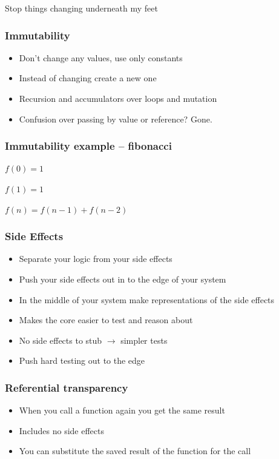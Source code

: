 \documentclass{beamer}
\begin{document}
\begin{frame}
\begin{center}
\Huge Stop things changing underneath my feet
\end{center}
\end{frame}

\begin{frame}
\frametitle{Immutability}
\begin{itemize}
\item Don't change any values, use only constants
\item Instead of changing create a new one
\item Recursion and accumulators over loops and mutation
\item Confusion over passing by value or reference? Gone.
\end{itemize}
\end{frame}

\begin{frame}
  \frametitle{Immutability example -- fibonacci}
  $f(0) = 1$

  $f(1) = 1$

  $f(n) = f(n - 1) +f(n - 2)$
\end{frame}

\begin{frame}
\frametitle{Side Effects}
\begin{itemize}
\item Separate your logic from your side effects
\item Push your side effects out in to the edge of your system
\item In the middle of your system make representations of the side effects
\item Makes the core easier to test and reason about
\item No side effects to stub $\rightarrow$ simpler tests
\item Push hard testing out to the edge
\end{itemize}
\end{frame}

\begin{frame}
\frametitle{Referential transparency}
\begin{itemize}
\item When you call a function again you get the same result
\item Includes no side effects
\item You can substitute the saved result of the function for the call
\end{itemize}
\end{frame}
\end{document}
